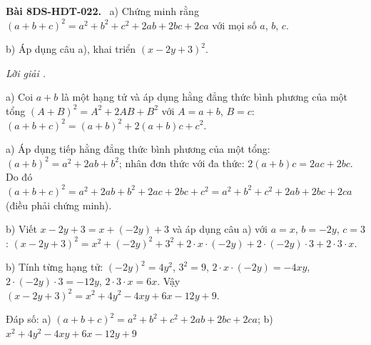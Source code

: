 \documentclass[12pt,a4paper]{article}
\newenvironment{problem}[1][]{\par\medskip\noindent\textbf{Bài #1.}\ }{\par}
\newenvironment{solution}[1][]{\par\noindent\textit{Lời giải #1.}\par}{\par}
\begin{document}
\begin{problem}[8DS-HDT-022]
a) Chứng minh rằng $(a + b + c)^2 = a^2 + b^2 + c^2 + 2ab + 2bc + 2ca$ với mọi số $a$, $b$, $c$.

b) Áp dụng câu a), khai triển $(x - 2y + 3)^2$.

\begin{solution}
a) Coi $a + b$ là một hạng tử và áp dụng hằng đẳng thức bình phương của một tổng $(A + B)^2 = A^2 + 2AB + B^2$ với $A = a + b$, $B = c$: $(a + b + c)^2 = (a + b)^2 + 2(a + b)c + c^2$.

a) Áp dụng tiếp hằng đẳng thức bình phương của một tổng: $(a + b)^2 = a^2 + 2ab + b^2$; nhân đơn thức với đa thức: $2(a + b)c = 2ac + 2bc$. Do đó $(a + b + c)^2 = a^2 + 2ab + b^2 + 2ac + 2bc + c^2 = a^2 + b^2 + c^2 + 2ab + 2bc + 2ca$ (điều phải chứng minh).

b) Viết $x - 2y + 3 = x + (-2y) + 3$ và áp dụng câu a) với $a = x$, $b = -2y$, $c = 3$: $(x - 2y + 3)^2 = x^2 + (-2y)^2 + 3^2 + 2 \cdot x \cdot (-2y) + 2 \cdot (-2y) \cdot 3 + 2 \cdot 3 \cdot x$.

b) Tính từng hạng tử: $(-2y)^2 = 4y^2$, $3^2 = 9$, $2 \cdot x \cdot (-2y) = -4xy$, $2 \cdot (-2y) \cdot 3 = -12y$, $2 \cdot 3 \cdot x = 6x$. Vậy $(x - 2y + 3)^2 = x^2 + 4y^2 - 4xy + 6x - 12y + 9$.

Đáp số: a) $\boxed{(a + b + c)^2 = a^2 + b^2 + c^2 + 2ab + 2bc + 2ca}$; b) $\boxed{x^2 + 4y^2 - 4xy + 6x - 12y + 9}$
\end{solution}
\end{problem}
\end{document}
